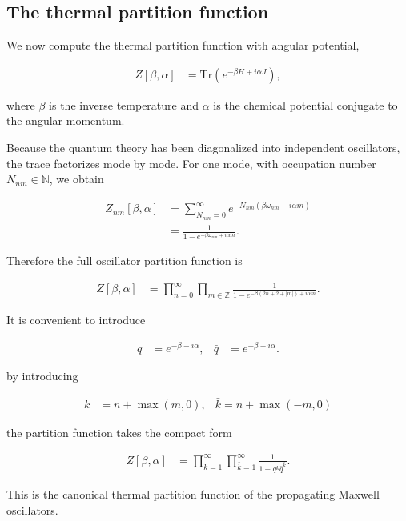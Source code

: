 \subsection{The thermal partition function}\label{subsec:thermal-partition-function}

We now compute the thermal partition function with angular potential,

\begin{align}
Z[\beta,\alpha] & =\mathrm{Tr}\left(e^{-\beta H+i\alpha J}\right),
\end{align}

where $\beta$ is the inverse temperature and $\alpha$ is the chemical potential conjugate to the angular momentum.

Because the quantum theory has been diagonalized into independent oscillators, the trace factorizes mode by mode. For one mode, with occupation number $N_{nm}\in \mathbb{N}$, we obtain

\begin{align}
Z_{nm}[\beta,\alpha] & =\sum _{N_{nm}=0}^{\infty}e^{-N_{nm}(\beta \omega_{nm}-i\alpha m)} \\
 & =\frac{1}{1-e^{-\beta \omega_{nm}+i\alpha m}}.
\end{align}

Therefore the full oscillator partition function is

\begin{align}
Z[\beta,\alpha] & =\prod _{n=0}^{\infty}\prod _{m\in \mathbb{Z}}\frac{1}{1-e^{-\beta(2n+2+|m|)+i\alpha m}}.
\end{align}

It is convenient to introduce

\begin{align}
q & =e^{-\beta-i\alpha}, & \bar{q} & =e^{-\beta+i\alpha}.
\end{align}

by introducing

\begin{align}
k & =n+\max(m,0),  & \bar{k}=n+\max(-m,0)
\end{align}

the partition function takes the compact form

\begin{align}
Z[\beta,\alpha] & =\prod _{k=1}^{\infty}\prod _{\bar{k}=1}^{\infty}\frac{1}{1-q^{k}\bar{q}^{\bar{k}}}.
\end{align}

This is the canonical thermal partition function of the propagating Maxwell oscillators.
